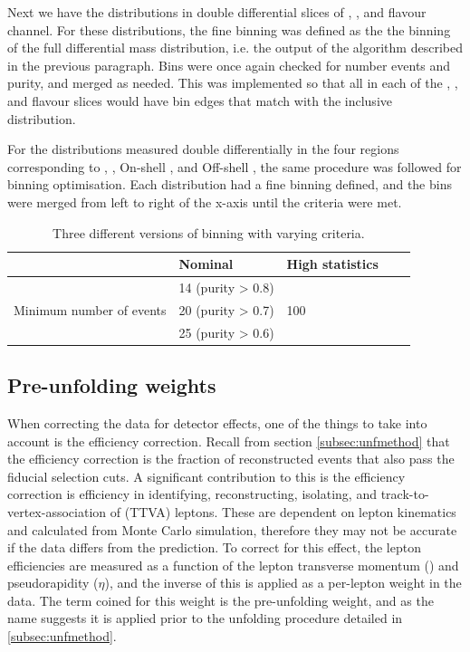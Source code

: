 Next we have the \mFourL distributions in double differential slices of \ptFourL, \yFourL, and flavour channel. For these distributions, the fine binning was defined as the the binning of the full \mFourL differential mass distribution, i.e. the output of the algorithm described in the previous paragraph. Bins were once again checked for number events and purity, and merged as needed. This was implemented so that all \mFourL in each of the  \ptFourL, \yFourL, and flavour slices would have bin edges that match with the inclusive distribution. 

For the distributions measured double differentially in the four \mFourL regions corresponding to \Z, \Higgs, On-shell \ZZ, and Off-shell \ZZ, the same procedure was followed for binning optimisation. Each distribution had a fine binning defined, and the bins were merged from left to right of the x-axis until the criteria were met. 

\begin{table}[bp]
  \begin{tabular}{lllll}
                & Nominal              & High statistics             \\
    \midrule
                                & 14 (purity > 0.8) &   \\
     Minimum number of events & 20 (purity > 0.7) & 100    \\
                                &25 (purity > 0.6) &    \\
  \end{tabular}
  \caption{Three different versions of binning with varying criteria.}
  \label{tab:BinningVersions}
\end{table}

\subsection{Pre-unfolding weights}
\label{subsec:preuf}

When correcting the data for detector effects, one of the things to take into account is the efficiency correction. Recall from section \ref{subsec:unfmethod} that the efficiency correction is the fraction of reconstructed events that also pass the fiducial selection cuts. A significant contribution to this is the efficiency correction is efficiency in identifying, reconstructing, isolating, and track-to-vertex-association of (TTVA) leptons. These are dependent on lepton kinematics and calculated from Monte Carlo simulation, therefore they may not be accurate if the data differs from the prediction. To correct for this effect, the lepton efficiencies are measured as a function of the lepton transverse momentum (\pt) and pseudorapidity ($\eta$), and the inverse of this is applied as a per-lepton weight in the data. The term coined for this weight is the pre-unfolding weight, and as the name suggests it is applied prior to the unfolding procedure detailed in \ref{subsec:unfmethod}. 

